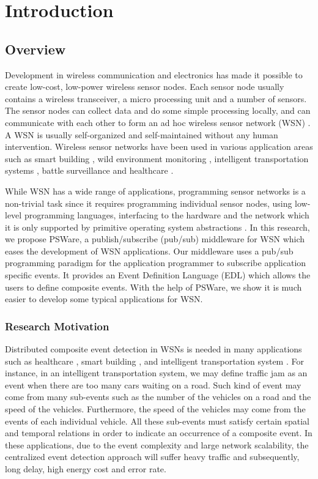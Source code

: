 \chapter{Introduction}
\section{Overview}
\label{sec:introduction}
Development in wireless communication and electronics has made it possible to create low-cost, low-power wireless sensor nodes. Each sensor node usually contains a wireless transceiver, a micro processing unit and a number of sensors. The sensor nodes can collect data and do some simple processing locally, and can communicate with each other to form an ad hoc wireless sensor network (WSN) \cite{aky:survey}. A WSN is usually self-organized and self-maintained without any human intervention. Wireless sensor networks have been used in various application areas such as smart building \cite{lynch:shm}, wild environment monitoring \cite{wsnhabitat}, intelligent transportation systems \cite{klein:its}, battle surveillance \cite{wsntracking} and healthcare \cite{lo:ban}. 

While WSN has a wide range of applications, programming sensor networks is a non-trivial task since it requires programming individual sensor nodes, using low-level programming languages, interfacing to the hardware and the network which it is only supported by primitive operating system abstractions \cite{programmingparadigms}. In this research, we propose PSWare, a publish/subscribe (pub/sub) middleware for WSN which eases the development of WSN applications. Our middleware uses a pub/sub programming paradigm for the application programmer to subscribe application specific events. It provides an Event Definition Language (EDL) which allows the users to define composite events. With the help of PSWare, we show it is much easier to develop some typical applications for WSN.

\subsection{Research Motivation}
Distributed composite event detection \cite{jector} in WSNs is needed in many applications such as healthcare \cite{lo:ban}, smart building \cite{lynch:shm}, and intelligent transportation system \cite{klein:its}. For instance, in an intelligent transportation system, we may define traffic jam as an event when there are too many cars waiting on a road. Such kind of event may come from many sub-events such as the number of the vehicles on a road and the speed of the vehicles. Furthermore, the speed of the vehicles may come from the events of each individual vehicle. All these sub-events must satisfy certain spatial and temporal relations in order to indicate an occurrence of a composite event. In these applications, due to the event complexity and large network scalability, the centralized event detection approach will suffer heavy traffic and subsequently, long delay, high energy cost and error rate.

